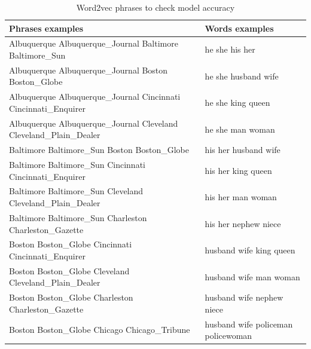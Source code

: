 \documentclass[letterpaper]{article}
\begin{document}
	\begin{table}[ht]
		\centering
		\begin{tabular}{|p{0.65\linewidth}|p{0.35\linewidth}|}
			\hline
			\textbf{Phrases examples} & \textbf{Words examples}\\
			\hline	  
			Albuquerque Albuquerque\_Journal Baltimore Baltimore\_Sun & he she his her\\
			Albuquerque Albuquerque\_Journal Boston Boston\_Globe & he she husband wife\\
			Albuquerque Albuquerque\_Journal Cincinnati Cincinnati\_Enquirer & he she king queen\\
			Albuquerque Albuquerque\_Journal Cleveland Cleveland\_Plain\_Dealer & he she man woman\\
			\hline
			Baltimore Baltimore\_Sun Boston Boston\_Globe& his her husband wife\\
			Baltimore Baltimore\_Sun Cincinnati Cincinnati\_Enquirer & his her king queen\\
			Baltimore Baltimore\_Sun Cleveland Cleveland\_Plain\_Dealer & his her man woman\\
			Baltimore Baltimore\_Sun Charleston Charleston\_Gazette & his her nephew niece\\
			\hline
			Boston Boston\_Globe Cincinnati Cincinnati\_Enquirer & husband wife king queen	\\
			Boston Boston\_Globe Cleveland Cleveland\_Plain\_Dealer & husband wife man woman\\
			Boston Boston\_Globe Charleston Charleston\_Gazette & husband wife nephew niece\\
			Boston Boston\_Globe Chicago Chicago\_Tribune & husband wife policeman policewoman\\
			
			\hline
		\end{tabular}
		\caption{Word2vec phrases to check model accuracy} %
		\label{tab:phrases-check-accuracy}
	\end{table}

        
\end{document}
